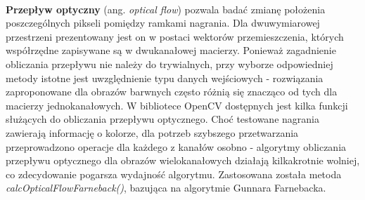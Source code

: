 \paragraph{}
\textbf{Przepływ optyczny} (ang. \textit{optical flow}) pozwala badać zmianę położenia poszczególnych pikseli pomiędzy ramkami nagrania. Dla dwuwymiarowej przestrzeni prezentowany jest on w postaci wektorów przemieszczenia, których współrzędne zapisywane są w dwukanałowej macierzy. Ponieważ zagadnienie obliczania przepływu nie należy do trywialnych, przy wyborze odpowiedniej metody istotne jest uwzględnienie typu danych wejściowych - rozwiązania zaproponowane dla obrazów barwnych często różnią się znacząco od tych dla macierzy jednokanałowych. W bibliotece OpenCV dostępnych jest kilka funkcji służących do obliczania przepływu optycznego. Choć testowane nagrania zawierają informację o kolorze, dla potrzeb szybszego przetwarzania przeprowadzono operacje dla każdego z kanałów osobno - algorytmy obliczania przepływu optycznego dla obrazów wielokanałowych działają kilkakrotnie wolniej, co zdecydowanie pogarsza wydajność algorytmu. Zastosowana została metoda \textit{calcOpticalFlowFarneback()}, bazująca na algorytmie Gunnara Farnebacka. 

